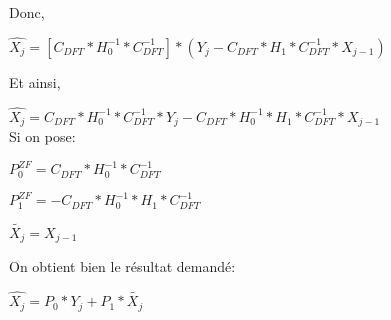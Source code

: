 Donc,

$\widehat{X_j}=[C_{DFT}*H_0^{-1}*C_{DFT}^{-1}]*(Y_j -
C_{DFT}*H_1*C_{DFT}^{-1}*X_{j-1})$

Et ainsi,

$\widehat{X_j}=C_{DFT}*H_0^{-1}*C_{DFT}^{-1}*Y_j -
C_{DFT}*H_0^{-1}*H_1*C_{DFT}^{-1}*X_{j-1}$
~\\

Si on pose:

$P_0^{ZF}=C_{DFT}*H_0^{-1}*C_{DFT}^{-1}$

$P_1^{ZF}=-C_{DFT}*H_0^{-1}*H_1*C_{DFT}^{-1}$

$\tilde{X_j}=X_{j-1}$

On obtient bien le résultat demandé:


$\widehat{X_j}= P_0*Y_j+P_1*\tilde{X_j}$




